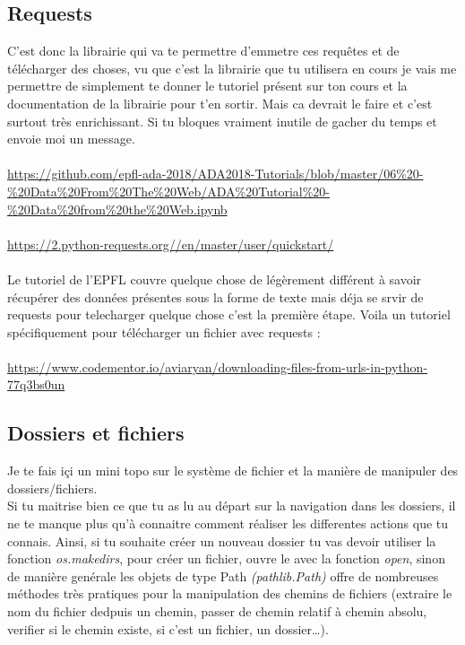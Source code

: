 \documentclass[10pt,a4paper]{book}
\begin{document}
\subsection{Requests}
C'est donc la librairie qui va te permettre d'emmetre ces requêtes et de télécharger des choses, vu que c'est la librairie que tu utilisera en cours je vais me permettre de simplement te donner le tutoriel présent sur ton cours et la documentation de la librairie pour t'en sortir. Mais ca devrait le faire et c'est surtout très enrichissant. Si tu bloques vraiment inutile de gacher du temps et envoie moi un message.
\\\\
\url{https://github.com/epfl-ada-2018/ADA2018-Tutorials/blob/master/06%20-%20Data%20From%20The%20Web/ADA%20Tutorial%20-%20Data%20from%20the%20Web.ipynb}
\\\\
\url{https://2.python-requests.org//en/master/user/quickstart/} 
\\\\
Le tutoriel de l'EPFL couvre quelque chose de légèrement différent à savoir récupérer des données présentes sous la forme de texte mais déja se srvir de requests pour telecharger quelque chose c'est la première étape. 
Voila un tutoriel spécifiquement pour télécharger un fichier avec requests :
\\\\
\url{https://www.codementor.io/aviaryan/downloading-files-from-urls-in-python-77q3bs0un}
\\
\subsection{Dossiers et fichiers}
Je te fais içi un mini topo sur le système de fichier et la manière de manipuler des dossiers/fichiers.
\\
Si tu maitrise bien ce que tu as lu au départ sur la navigation dans les dossiers, il ne te manque plus qu'à connaitre comment réaliser les differentes actions que tu connais.
Ainsi, si tu souhaite créer un nouveau dossier tu vas devoir utiliser la fonction \textit{os.makedirs}, pour créer un fichier, ouvre le avec la fonction \textit{open}, sinon de manière genérale les objets de type Path \textit{(pathlib.Path)} offre de nombreuses méthodes très pratiques pour la manipulation des chemins de fichiers (extraire le nom du fichier dedpuis un chemin, passer de chemin relatif à chemin absolu, verifier si le chemin existe, si c'est un fichier, un dossier\ldots). 
\end{document}
